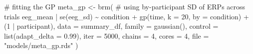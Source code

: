 \documentclass[
  doc,
  floatsintext,
  longtable,
  a4paper,
  nolmodern,
  notxfonts,
  notimes,
  colorlinks=true,linkcolor=blue,citecolor=blue,urlcolor=blue]{apa7}
\newenvironment{Shaded}{\begin{snugshade}}{\end{snugshade}}
\newcommand{\AttributeTok}[1]{\textcolor[rgb]{0.40,0.45,0.13}{#1}}
\newcommand{\CommentTok}[1]{\textcolor[rgb]{0.37,0.37,0.37}{#1}}
\newcommand{\DecValTok}[1]{\textcolor[rgb]{0.68,0.00,0.00}{#1}}
\newcommand{\FloatTok}[1]{\textcolor[rgb]{0.68,0.00,0.00}{#1}}
\newcommand{\FunctionTok}[1]{\textcolor[rgb]{0.28,0.35,0.67}{#1}}
\newcommand{\NormalTok}[1]{\textcolor[rgb]{0.00,0.23,0.31}{#1}}
\newcommand{\OtherTok}[1]{\textcolor[rgb]{0.00,0.23,0.31}{#1}}
\newcommand{\SpecialCharTok}[1]{\textcolor[rgb]{0.37,0.37,0.37}{#1}}
\newcommand{\StringTok}[1]{\textcolor[rgb]{0.13,0.47,0.30}{#1}}
\begin{document}
\begin{Shaded}
\begin{Highlighting}[]
\CommentTok{\# fitting the GP}
\NormalTok{meta\_gp }\OtherTok{\textless{}{-}} \FunctionTok{brm}\NormalTok{(}
    \CommentTok{\# using by{-}participant SD of ERPs across trials}
\NormalTok{    eeg\_mean }\SpecialCharTok{|} \FunctionTok{se}\NormalTok{(eeg\_sd) }\SpecialCharTok{\textasciitilde{}}
\NormalTok{        condition }\SpecialCharTok{+} \FunctionTok{gp}\NormalTok{(time, }\AttributeTok{k =} \DecValTok{20}\NormalTok{, }\AttributeTok{by =}\NormalTok{ condition) }\SpecialCharTok{+}
\NormalTok{        (}\DecValTok{1} \SpecialCharTok{|}\NormalTok{ participant),}
    \AttributeTok{data =}\NormalTok{ summary\_df,}
    \AttributeTok{family =} \FunctionTok{gaussian}\NormalTok{(),}
    \AttributeTok{control =} \FunctionTok{list}\NormalTok{(}\AttributeTok{adapt\_delta =} \FloatTok{0.99}\NormalTok{),}
    \AttributeTok{iter =} \DecValTok{5000}\NormalTok{,}
    \AttributeTok{chains =} \DecValTok{4}\NormalTok{,}
    \AttributeTok{cores =} \DecValTok{4}\NormalTok{,}
    \AttributeTok{file =} \StringTok{"models/meta\_gp.rds"}
\NormalTok{    )}
\end{Highlighting}
\end{Shaded}
\end{document}
